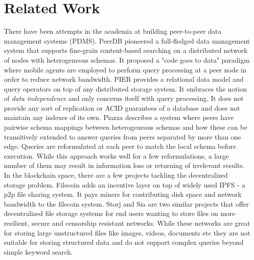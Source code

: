 \section{Related Work}
There have been attempts in the academia at building peer-to-peer data management systems (PDMS). PeerDB \cite{PeerDB} pioneered a full-fledged data management system that supports fine-grain content-based searching on a distributed network of nodes with heterogeneous schemas. It proposed a "code goes to data" paradigm where mobile agents are employed to perform query processing at a peer node in order to reduce network bandwidth. PIER \cite{PIER} provides a relational data model and query operators on top of any distributed storage system. It embraces the notion of \textit{data independence} and only concerns itself with query processing. It does not provide any sort of replication or ACID guarantees of a database and does not maintain any indexes of its own. Piazza \cite{Piazza} describes a system where peers have pairwise schema mappings between heterogeneous schemas and how these can be transitively extended to answer queries from peers separated by more than one edge. Queries are reformulated at each peer to match the local schema before execution. While this approach works well for a few reformulations, a large number of them may result in information loss or returning of irrelevant results.
\newline\newline
In the blockchain space, there are a few projects tackling the decentralized storage problem. Filecoin \cite{Filecoin}
adds an incentive layer on top of widely used IPFS \cite{ipfs} - a p2p file sharing system. It pays miners for
contributing disk space and network bandwidth to the filecoin system. Storj \cite{Storj} and Sia \cite{Sia} are two
similar projects that offer decentralized file storage systems for end users wanting to store files on more resilient,
secure and censorship resistant networks. While these networks are great for storing large unstructured files like
images, videos, documents etc they are not suitable for storing structured data and do not support complex queries
beyond simple keyword search.
\newline\newline
